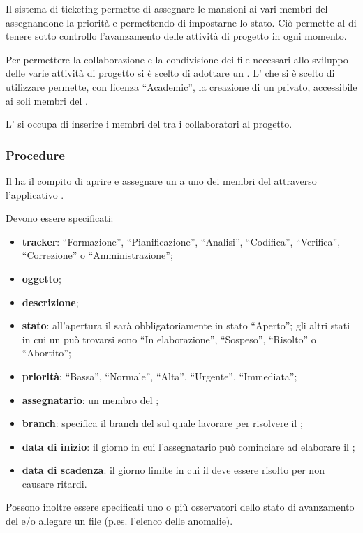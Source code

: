 \documentclass[a4paper, titlepage]{article}
\begin{document}
Il sistema di ticketing permette di assegnare le mansioni ai vari membri del  assegnandone la priorità e permettendo di impostarne lo stato. Ciò permette al  di tenere sotto controllo l'avanzamento delle attività di progetto in ogni momento.

Per permettere la collaborazione e la condivisione dei file necessari allo sviluppo delle varie attività di progetto si è scelto di adottare un . L' che si è scelto di utilizzare permette, con licenza ``Academic'', la creazione di un  privato, accessibile ai soli membri del .

L' si occupa di inserire i membri del  tra i collaboratori al progetto.

\subsubsection{Procedure}

Il  ha il compito di aprire e assegnare un  a uno dei membri del  attraverso l'applicativo .

Devono essere specificati:
\begin{itemize}
	\item \textbf{tracker}: ``Formazione'', ``Pianificazione'', ``Analisi'', ``Codifica'', ``Verifica'', ``Correzione'' o ``Amministrazione'';
	\item \textbf{oggetto};
	\item \textbf{descrizione};
	\item \textbf{stato}: all'apertura il  sarà obbligatoriamente in stato ``Aperto''; gli altri stati in cui un  può trovarsi sono ``In elaborazione'', ``Sospeso'', ``Risolto'' o ``Abortito'';
	\item \textbf{priorità}: ``Bassa'', ``Normale'', ``Alta'', ``Urgente'', ``Immediata'';
	\item \textbf{assegnatario}: un membro del ;
	\item \textbf{branch}: specifica il branch del  sul quale lavorare per risolvere il ;
	\item \textbf{data di inizio}: il giorno in cui l'assegnatario può cominciare ad elaborare il ;
	\item \textbf{data di scadenza}: il giorno limite in cui il  deve essere risolto per non causare ritardi.
\end{itemize}
Possono inoltre essere specificati uno o più osservatori dello stato di avanzamento del  e/o allegare un file (p.es. l'elenco delle anomalie).
\end{document}
